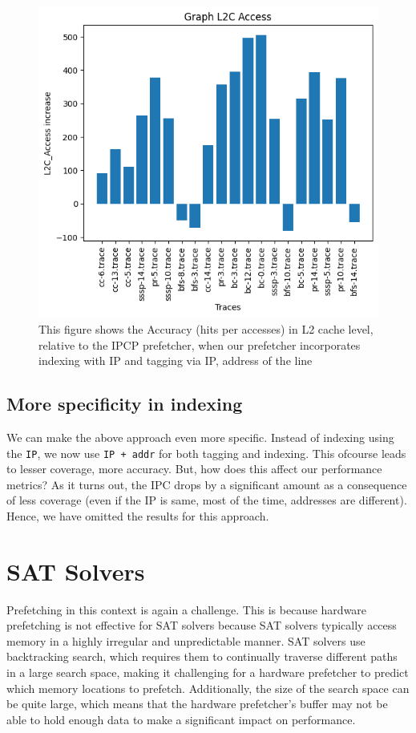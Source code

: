 \documentclass[conference]{IEEEtran}
\begin{document}
\begin{figure}
\includegraphics[scale=0.5]{Images/graph_l2c.png}
\caption{This figure shows the Accuracy (hits per accesses) in L2 cache level, relative to the IPCP prefetcher, when our prefetcher incorporates indexing with IP and tagging via IP, address of the line}
\label{graph_l2c}
\end{figure}

\subsection{More specificity in indexing}
We can make the above approach even more specific. Instead of indexing using the \verb|IP|, we now use \verb|IP + addr| for both tagging and indexing. This ofcourse leads to lesser coverage, more accuracy. But, how does this affect our performance metrics? As it turns out, the IPC drops by a significant amount as a consequence of less coverage (even if the IP is same, most of the time, addresses are different). Hence, we have omitted the results for this approach.

\section{SAT Solvers}
Prefetching in this context is again a challenge. This is because hardware prefetching is not effective for SAT solvers because SAT solvers typically access memory in a highly irregular and unpredictable manner. SAT solvers use backtracking search, which requires them to continually traverse different paths in a large search space, making it challenging for a hardware prefetcher to predict which memory locations to prefetch. Additionally, the size of the search space can be quite large, which means that the hardware prefetcher's buffer may not be able to hold enough data to make a significant impact on performance. 
\end{document}
